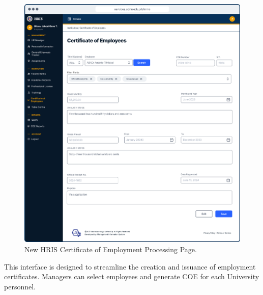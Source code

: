     \begin{figure}[H]
        \centering
        \includegraphics[width=1\linewidth]{figures/app/coe.png}
        \caption{New HRIS Certificate of Employment Processing Page.}
        \label{fig:enter-label}
    \end{figure}

    This interface is designed to streamline the creation and issuance of employment certificates. Managers can select employees and generate COE for each University personnel.